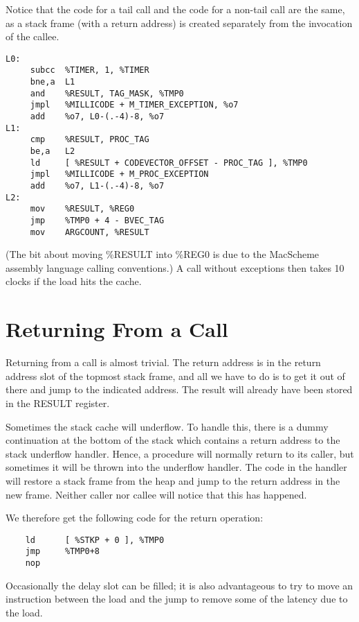 Notice that the code for a tail call and the code for a non-tail call are
the same, as a stack frame (with a return address) is created separately
from the invocation of the callee.

\begin{verbatim}
L0:
     subcc  %TIMER, 1, %TIMER
     bne,a  L1
     and    %RESULT, TAG_MASK, %TMP0
     jmpl   %MILLICODE + M_TIMER_EXCEPTION, %o7
     add    %o7, L0-(.-4)-8, %o7
L1:
     cmp    %RESULT, PROC_TAG
     be,a   L2
     ld     [ %RESULT + CODEVECTOR_OFFSET - PROC_TAG ], %TMP0
     jmpl   %MILLICODE + M_PROC_EXCEPTION
     add    %o7, L1-(.-4)-8, %o7
L2:
     mov    %RESULT, %REG0
     jmp    %TMP0 + 4 - BVEC_TAG
     mov    ARGCOUNT, %RESULT
\end{verbatim}

(The bit about moving \%RESULT into \%REG0 is due to the MacScheme assembly
language calling conventions.) A call without exceptions then takes 10
clocks if the load hits the cache.

\section{Returning From a Call}

Returning from a call is almost trivial. The return address is in the
return address slot of the topmost stack frame, and all we have to do
is to get it out of there and jump to the indicated address. The result
will already have been stored in the RESULT register.

Sometimes the stack cache will underflow. To handle this, there is a dummy
continuation at the bottom of the stack which contains a return address to
the stack underflow handler. Hence, a procedure will normally return to its
caller, but sometimes it will be thrown into the underflow handler. The code
in the handler will restore a stack frame from the heap and jump to the
return address in the new frame. Neither caller nor callee will notice that
this has happened.

We therefore get the following code for the return operation:

\begin{verbatim}
    ld      [ %STKP + 0 ], %TMP0
    jmp     %TMP0+8
    nop
\end{verbatim}

Occasionally the delay slot can be filled; it is also advantageous to
try to move an instruction between the load and the jump to remove some
of the latency due to the load.

